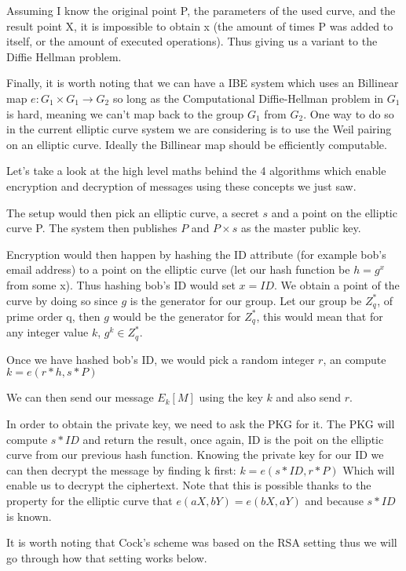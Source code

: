 \documentclass[conference]{IEEEtran}
\begin{document}
Assuming I know the original point P, the parameters of the used curve, and the result point X, it is impossible
to obtain x (the amount of times P was added to itself, or the amount of executed operations).
Thus giving us a variant to the Diffie Hellman problem.

Finally, it is worth noting that we can have a IBE system which uses an Billinear map 
$e: G_{1}\times G_{1} \rightarrow G_{2}$ so long as the Computational Diffie-Hellman problem 
in $G_{1}$ is hard, meaning we can't map back to the group $G_{1}$ from $G_{2}$. 
One way to do so in the current elliptic curve system we are considering is to use 
the Weil pairing on an elliptic curve. Ideally the Billinear map should be efficiently computable.


Let's take a look at the high level maths behind the 4 algorithms which enable 
encryption and decryption of messages using these concepts we just saw.

The setup would then pick an elliptic curve, a secret $s$ and a point on the 
elliptic curve P. The system then publishes $P$ and $P\times s$ as the master public key.


Encryption would then happen by hashing the ID attribute (for example bob's email address)
to a point on the elliptic curve (let our hash function be $h = g^x$ from some x). Thus
hashing bob's ID would set $ x = ID$. We obtain a point of the curve by doing so since $g$
is the generator for our group. Let our group be $Z_{q}^*$, of prime order q, then $g$
would be the generator for $Z_{q}^*$, this would mean that for any integer value $k$,
$g^k \in Z_{q}^*$.

Once we have hashed bob's ID, we would pick a random integer $r$, an compute 
$k = e(r*h, s*P)$

We can then send our message $E_{k}[M]$ using the key $k$ and also send $r$.

In order to obtain the private key, we need to ask the PKG for it. The PKG will
compute $s*ID$ and return the result, once again, ID is the poit on the elliptic curve 
from our previous hash function. Knowing the private key for our ID we can then decrypt 
the message by finding k first: $k = e(s*ID, r*P)$ Which will enable us to decrypt the 
ciphertext.
Note that this is possible thanks to the property for the elliptic curve that 
$e(aX, bY) = e(bX, aY)$ and because $s*ID$ is known.

It is worth noting that Cock's scheme was based on the RSA setting thus we will go through 
how that setting works below.
\end{document}
